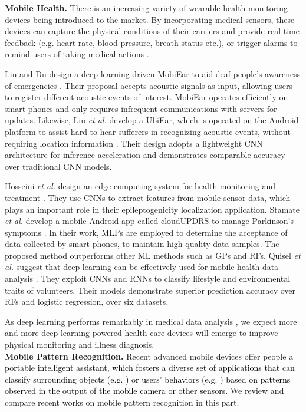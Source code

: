 \documentclass[journal,comsoc,letter]{IEEEtran}
\newcommand{\edit}[1]{\textcolor{black}{#1}}
\begin{document}
\noindent\textbf{Mobile Health.}
There is an increasing variety of wearable health monitoring devices being introduced to the market. By incorporating medical sensors, these devices can capture the physical conditions of their carriers and provide real-time feedback (e.g. heart rate, blood pressure, breath status etc.), or trigger alarms to remind users of taking medical actions \cite{ravi2017deep}. 

Liu and Du design a deep learning-driven MobiEar to aid deaf people's awareness of emergencies \cite{liu2016poster}. Their proposal accepts acoustic signals as input, allowing users to register different acoustic events of interest. MobiEar operates efficiently on smart phones and only requires infrequent communications with servers for updates. Likewise, Liu \emph{et al.} develop a UbiEar, which is operated on the Android platform to assist hard-to-hear sufferers in recognizing acoustic events, without requiring location information \cite{sicong2017ubiear}. Their design adopts a lightweight CNN architecture for inference acceleration and demonstrates comparable accuracy over traditional CNN models.

Hosseini \emph{et al.} design an edge computing system for health monitoring and treatment \cite{hosseini2017deep}. They use CNNs to extract features from mobile sensor data, which plays an important role in their epileptogenicity localization application. Stamate \emph{et al.} develop a mobile Android app called cloudUPDRS to manage Parkinson's symptoms \cite{stamate2017deep}. In their work, MLPs are employed to determine the acceptance of data collected by smart phones, to maintain high-quality data samples. The proposed method outperforms other ML methods such as GPs and RFs. Quisel \emph{et al.} suggest that deep learning can be effectively used for mobile health data analysis \cite{quisel2017collecting}. They exploit CNNs and RNNs to classify lifestyle and environmental traits of volunteers. Their models demonstrate superior prediction accuracy over RFs and logistic regression, over six datasets. 

As deep learning performs remarkably in medical data analysis \cite{miotto2017deep}, we expect more and more deep learning powered health care devices will emerge to improve physical monitoring and illness diagnosis.\\

\noindent\textbf{Mobile Pattern Recognition.} Recent advanced mobile devices offer people a \edit{portable intelligent assistant, which fosters a diverse set of applications that can classify surrounding objects (e.g. \cite{li2016deepcham, tobias2016convolutional, teng2016facial, pouladzadeh2017mobile}) or users' behaviors (e.g. \cite{zeng2014convolutional, ronao2016human, chen2015deep, bhattacharya2016smart, ordonez2016deep,  ha2016convolutional, wang2017deep}) based on patterns observed in the output of the mobile camera or other sensors.} We review and compare recent works on mobile pattern recognition in this part. 
\end{document}
